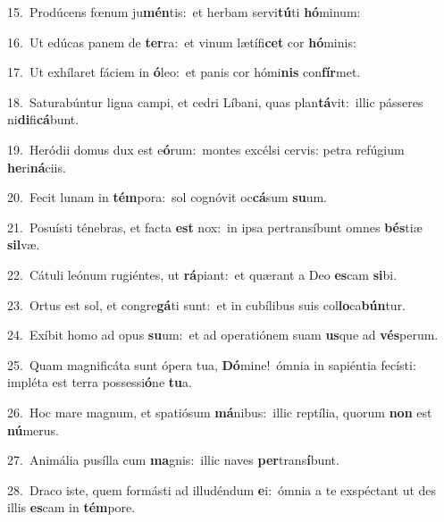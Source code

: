 {\numbfont\textcolor{\numbcolor}{15.}}~Prodúcens fœnum ju\-\textbf{mén}\-tis:~\star et herbam servi\-\textbf{tú}\-ti \textbf{hó}\-minum:\par
{\numbfont\textcolor{\numbcolor}{16.}}~Ut edúcas panem de \textbf{ter}\-ra:~\star et vinum lætífi\textbf{cet} cor \textbf{hó}\-minis:\par
{\numbfont\textcolor{\numbcolor}{17.}}~Ut exhílaret fáciem in \textbf{ó}\-leo:~\star et panis cor hómi\textbf{nis} con\-\textbf{fír}\-met.\par
{\numbfont\textcolor{\numbcolor}{18.}}~Saturabúntur ligna campi, et cedri Líbani, quas plan\-\textbf{tá}\-vit:~\star illic pásseres ni\-\textbf{di}\-fi\-\textbf{cá}\-bunt.\par
{\numbfont\textcolor{\numbcolor}{19.}}~Heródii domus dux est e\-\textbf{ó}\-rum:~\star montes excélsi cervis: petra refúgium \textbf{he}\-ri\-\textbf{ná}\-ciis.\par
{\numbfont\textcolor{\numbcolor}{20.}}~Fecit lunam in \textbf{tém}\-pora:~\star sol cognóvit oc\-\textbf{cá}\-sum \textbf{su}\-um.\par
{\numbfont\textcolor{\numbcolor}{21.}}~Posuísti ténebras, et facta \textbf{est} nox:~\star in ipsa pertransíbunt omnes \textbf{bés}\-tiæ \textbf{sil}\-væ.\par
{\numbfont\textcolor{\numbcolor}{22.}}~Cátuli leónum rugiéntes, ut \textbf{rá}\-piant:~\star et quærant a Deo \textbf{es}\-cam \textbf{si}\-bi.\par
{\numbfont\textcolor{\numbcolor}{23.}}~Ortus est sol, et congre\-\textbf{gá}\-ti sunt:~\star et in cubílibus suis col\-\textbf{lo}\-ca\-\textbf{bún}\-tur.\par
{\numbfont\textcolor{\numbcolor}{24.}}~Exíbit homo ad opus \textbf{su}\-um:~\star et ad operatiónem suam \textbf{us}\-que ad \textbf{vés}\-perum.\par
{\numbfont\textcolor{\numbcolor}{25.}}~Quam magnificáta sunt ópera tua, \textbf{Dó}\-mine!~\star ómnia in sapiéntia fecísti: impléta est terra possessi\-\textbf{ó}\-ne \textbf{tu}\-a.\par
{\numbfont\textcolor{\numbcolor}{26.}}~Hoc mare magnum, et spatiósum \textbf{má}\-nibus:~\star illic reptília, quorum \textbf{non} est \textbf{nú}\-merus.\par
{\numbfont\textcolor{\numbcolor}{27.}}~Animália pusílla cum \textbf{ma}\-gnis:~\star illic naves \textbf{per}\-trans\-\textbf{í}\-bunt.\par
{\numbfont\textcolor{\numbcolor}{28.}}~Draco iste, quem formásti ad illudéndum \textbf{e}\-i:~\star ómnia a te exspéctant ut des illis \textbf{es}\-cam in \textbf{tém}\-pore.\par
